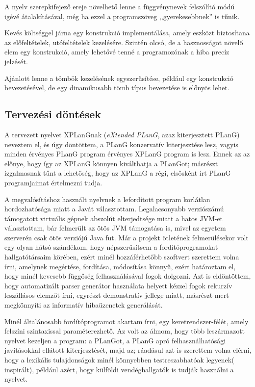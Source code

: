 A nyelv szerepkifejező ereje növelhető lenne a függvénynevek felszólító módú igévé átalakításával, még ha ezzel a programszöveg ,,gyerekesebbnek'' is tűnik.

Kevés költséggel járna egy  konstrukció implementálása, amely eszközt biztosítana az előfeltételek, utófeltételek kezelésére.
Szintén olcsó, de a hasznosságot növelő elem egy  konstrukció, amely lehetővé tenné a programozónak a hiba precíz jelzését.

Ajánlott lenne a tömbök kezelésének egyszerűsítése, például egy  konstrukció bevezetésével, de egy dinamikusabb tömb típus bevezetése is előnyös lehet.


\subsection{Tervezési döntések}\label{subsec:plans}
A tervezett nyelvet XPLanGnak (\textit{eXtended PLanG}, azaz kiterjesztett PLanG) neveztem el, és úgy döntöttem, a PLanG konzervatív kiterjesztése lesz, vagyis minden érvényes PLanG program érvényes XPLanG program is lesz.
Ennek az az előnye, hogy így az XPLanG könnyen kiválthatja a PLanGot; másrészt izgalmasnak tűnt a lehetőség, hogy az XPLanG a régi, elsősként írt PLanG programjaimat értelmezni tudja.

A megvalósításhoz használt nyelvnek a lefordított program korlátlan hordozhatósága miatt a Javát választottam.
Legalacsonyabb verziószámú támogatott virtuális gépnek abszolút elterjedtsége miatt a hatos JVM-et választottam, bár felmerült az ötös JVM támogatása is, mivel az egyetem  szerverén csak ötös verziójú Java fut.
Már a projekt ötletének felmerülésekor volt egy olyan hátsó szándékom, hogy népszerűsítsem a fordítóprogramokat hallgatótársaim körében, ezért minél hozzáférhetőbb szoftvert szerettem volna írni, amelynek megértése, fordítása, módosítása könnyű, ezért határoztam el, hogy minél kevesebb függőség felhasználásával fogok dolgozni.
Azt is eldöntöttem, hogy automatizált parser generátor használata helyett kézzel fogok rekurzív leszállásos elemzőt írni, egyrészt demonstratív jellege miatt, másrészt mert megkönnyíti az informatív hibaüzenetek generálását.

Minél általánosabb fordítóprogramot akartam írni, egy  keretrendszer-félét, amely felszíni szintaxissal paraméterezhető.
Az volt az álmom, hogy több leszármazott nyelvet kezeljen a program: a PLanGot, a PLanG apró felhasználhatósági javításokkal ellátott kiterjesztését, majd az; ráadásul azt is szerettem volna elérni, hogy a lexikális tulajdonságok minél könnyebben testreszabhatóak legyenek(\cite{Balogh12} inspirált), például azért, hogy külföldi vendéghallgatók is tudják használni a nyelvet.

